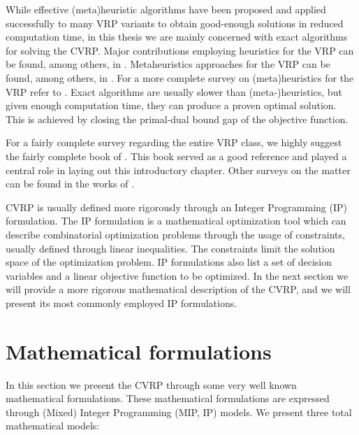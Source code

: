 While effective (meta)heuristic algorithms have been proposed and applied
successfully to many VRP variants to obtain good-enough solutions
in reduced computation time, in this thesis we are mainly concerned
with exact algorithms for solving the CVRP.
Major contributions employing heuristics for the VRP can be found, among others, in
\textcite{clarke1964, desrochers1989matching, paessens1988savings, foster1976integer}.
Metaheuristics approaches for the VRP can be found, among others, in
\textcite{gendreau1994tabu, cordeau2012parallel, toth2003granular, li2005very, pisinger2007, kytojoki2007efficient, nagata2009,vidal2012, subramanian2013}.
For a more complete survey on (meta)heuristics for the VRP refer to
\textcite{golden1998impact,gendreau2002metaheuristics,gendreau2008,laporte2014chapter,elshaer2020taxonomic}.
Exact algorithms are usually slower than (meta-)heuristics, but given
enough computation time, they can produce a proven optimal solution.
This is achieved by closing the primal-dual bound gap of the objective function.

\medskip

For a fairly complete survey regarding the entire VRP class, we highly suggest
the fairly complete book  of \textcite{toth2014}.
This book served as a good reference and played a central role
in laying out this introductory chapter.
Other surveys on the matter can be found in the works of \textcite{cordeau2007, baldacci2012, caceres-cruz2015, costa2019}.

\medskip


CVRP is usually defined more rigorously through an Integer Programming (IP) formulation.
The IP formulation is a mathematical optimization tool
which can describe combinatorial optimization problems
through the usage of constraints, usually defined through linear inequalities.
The constraints limit the solution space of the optimization problem.
IP formulations also list a set of decision variables and a linear objective function to be optimized.
In the next section we will provide a more rigorous mathematical
description of the CVRP, and we will present its most commonly employed IP formulations.


\section{Mathematical formulations}
\label{sec:intro-cvrp-mathematical-formulations}

In this section we present the CVRP through some very well known mathematical formulations.
These mathematical formulations are expressed through (Mixed) Integer Programming (MIP, IP)
models.
We present three total mathematical models:

